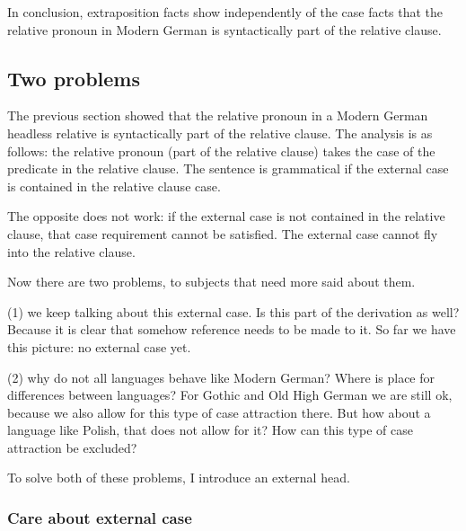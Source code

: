 In conclusion, extraposition facts show independently of the case facts that the relative pronoun in Modern German is syntactically part of the relative clause.


\subsection{Two problems}

The previous section showed that the relative pronoun in a Modern German headless relative is syntactically part of the relative clause. The analysis is as follows: the relative pronoun (part of the relative clause) takes the case of the predicate in the relative clause. The sentence is grammatical if the external case is contained in the relative clause case.

The opposite does not work: if the external case is not contained in the relative clause, that case requirement cannot be satisfied. The external case cannot fly into the relative clause.

Now there are two problems, to subjects that need more said about them.

(1) we keep talking about this external case. Is this part of the derivation as well? Because it is clear that somehow reference needs to be made to it. So far we have this picture: no external case yet. %

(2) why do not all languages behave like Modern German? Where is place for differences between languages? For Gothic and Old High German we are still ok, because we also allow for this type of case attraction there. But how about a language like Polish, that does not allow for it? How can this type of case attraction be excluded?

To solve both of these problems, I introduce an external head. %


\subsubsection{Care about external case}

